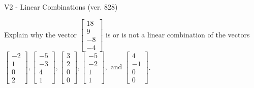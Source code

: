 \begin{exercise}
  \begin{exerciseTitle}V2 - Linear Combinations (ver. 828)\end{exerciseTitle}
  \begin{exerciseStatement}
    Explain why the vector \(\left[\begin{array}{c}
18 \\
9 \\
-8 \\
-4
\end{array}\right]\)  is or is not a linear 
	combination of the vectors \(\left[\begin{array}{c}
-2 \\
1 \\
0 \\
2
\end{array}\right] , \left[\begin{array}{c}
-5 \\
-3 \\
4 \\
1
\end{array}\right] , \left[\begin{array}{c}
3 \\
2 \\
0 \\
0
\end{array}\right] , \left[\begin{array}{c}
-5 \\
-2 \\
1 \\
1
\end{array}\right] , \text{ and } \left[\begin{array}{c}
4 \\
-1 \\
0 \\
0
\end{array}\right]\).
	



\end{exerciseStatement}
\end{exercise}
